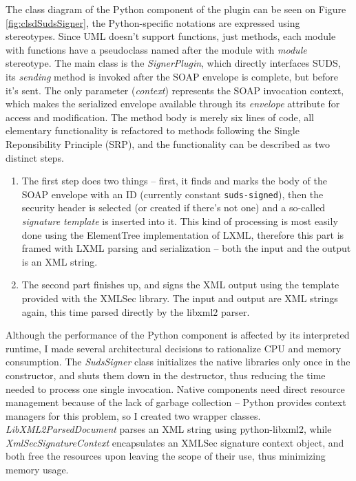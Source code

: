 The class diagram of the Python component of the plugin can be seen on Figure \ref{fig:clsdSudsSigner}, the Python-specific notations are expressed using stereotypes. Since UML doesn't support functions, just methods, each module with functions have a pseudoclass named after the module with \emph{module} stereotype. The main class is the \emph{SignerPlugin}, which directly interfaces SUDS, its \emph{sending} method is invoked after the SOAP envelope is complete, but before it's sent. The only parameter (\emph{context}) represents the SOAP invocation context, which makes the serialized envelope available through its \emph{envelope} attribute for access and modification. The method body is merely six lines of code, all elementary functionality is refactored to methods following the Single Reponsibility Principle (SRP), and the functionality can be described as two distinct steps.

\begin{enumerate}
 \item The first step does two things -- first, it finds and marks the body of the SOAP envelope with an ID (currently constant \verb|suds-signed|), then the security header is selected (or created if there's not one) and a so-called \emph{signature template} is inserted into it. This kind of processing is most easily done using the ElementTree implementation of LXML, therefore this part is framed with LXML parsing and serialization -- both the input and the output is an XML string.
 \item The second part finishes up, and signs the XML output using the template provided with the XMLSec library. The input and output are XML strings again, this time parsed directly by the libxml2 parser.
\end{enumerate}

Although the performance of the Python component is affected by its interpreted runtime, I made several architectural decisions to rationalize CPU and memory consumption. The \emph{SudsSigner} class initializes the native libraries only once in the constructor, and shuts them down in the destructor, thus reducing the time needed to process one single invocation. Native components need direct resource management because of the lack of garbage collection -- Python provides context managers for this problem, so I created two wrapper classes. \emph{LibXML2ParsedDocument} parses an XML string using python-libxml2, while \emph{XmlSecSignatureContext} encapsulates an XMLSec signature context object, and both free the resources upon leaving the scope of their use, thus minimizing memory usage.


